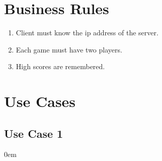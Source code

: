 \documentclass[titlepage]{article}
\begin{document}
	\section{Business Rules}
	
	\begin{enumerate}
		\item Client must know the ip address of the server.
		\item Each game must have two players.
		\item High scores are remembered.
	\end{enumerate}
	
	\section{Use Cases}
	\subsection{Use Case 1}
	\itemsep0em 
\end{document}
